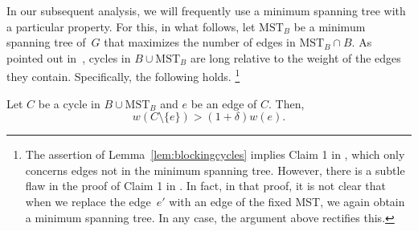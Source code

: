 \documentclass[a4paper,cleveref, autoref, thm-restate, thm-restate, UKenglish]{lipics-v2021}
\begin{document}
\newcommand{\mstb}{\mathrm{MST}_B}

In our subsequent analysis, we will frequently use a minimum spanning tree with a particular property. For this, in what follows, let $\mstb$ be a minimum spanning tree of~$G$ that maximizes the number of edges in $\mstb \cap B$.
As pointed out in~\cite{megow}, cycles in $B\cup \mstb$ are long relative to the weight of the edges they contain. 
Specifically, the following holds.
\footnote{The assertion of Lemma~\ref{lem:blockingcycles} implies Claim 1 in \cite{megow}, which only concerns edges not in the minimum spanning tree. 
However, there is a subtle flaw in the proof of Claim 1 in \cite{megow}. 
In fact, in that proof, it is not clear that when we replace the edge~$e'$ with an edge of the fixed MST, we again obtain a minimum spanning tree. In any case, the argument above rectifies this. }

\begin{lemma}\label{lem:blockingcycles}
Let $C$ be a cycle in $B \cup \mstb$ and $e$ be an edge of $C$. Then, 
\begin{equation*}
 w(C \setminus \{e\})> (1+\delta) w(e).
 \end{equation*}
\end{lemma}
\end{document}
